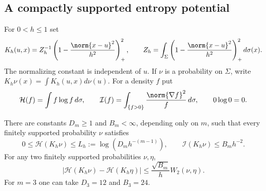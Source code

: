 \subsection{A compactly supported entropy potential}
For $0<h\le1$ set
\begin{equation}\label{eq:kernel61}
 K_h(u,x)=Z_h^{-1}\left(1-\frac{\norm{x-u}^2}{h^2}\right)_+^2,
 \qquad Z_h=\int_\Sigma\left(1-\frac{\norm{x-u}^2}{h^2}\right)_+^2d\sigma(x).
\end{equation}
The normalizing constant is independent of $u$. If $\nu$ is a
probability on $\Sigma$, write $K_h\nu(x)=\int K_h(u,x)d\nu(u)$.
For a density $f$ put
\[
 \mathcal H(f)=\int f\log f\,d\sigma,\qquad
 \mathcal I(f)=\int_{\{f>0\}}\frac{\norm{\nabla f}^2}{f}\,d\sigma,
 \qquad 0\log0=0.
\]

\begin{lemma}\label{lem:smoothentropy61}
There are constants $D_m\ge1$ and $B_m<\infty$, depending only on $m$,
such that every finitely supported probability $\nu$ satisfies
\begin{equation}\label{eq:kernelbounds61}
 0\le\mathcal H(K_h\nu)\le L_h:=\log(D_mh^{-(m-1)}),\qquad
 \mathcal I(K_h\nu)\le B_mh^{-2}.
\end{equation}
For any two finitely supported probabilities $\nu,\eta$,
\begin{equation}\label{eq:enttransport61}
 |\mathcal H(K_h\nu)-\mathcal H(K_h\eta)|
                 \le \frac{\sqrt{B_m}}h W_2(\nu,\eta).
\end{equation}
For $m=3$ one can take $D_3=12$ and $B_3=24$.
\end{lemma}
